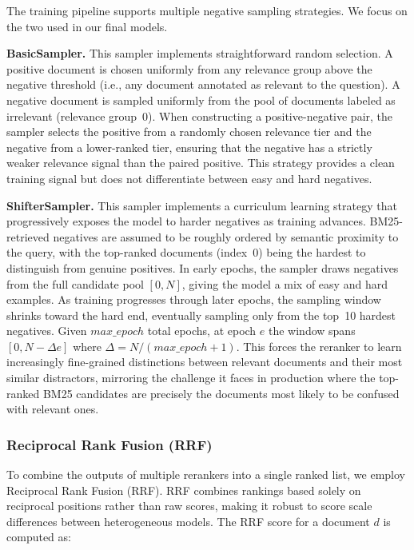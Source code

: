 The training pipeline supports multiple negative sampling strategies. We focus on the two used in our final models.

\textbf{BasicSampler.} This sampler implements straightforward random selection. A positive document is chosen uniformly from any relevance group above the negative threshold (i.e., any document annotated as relevant to the question). A negative document is sampled uniformly from the pool of documents labeled as irrelevant (relevance group~0). When constructing a positive-negative pair, the sampler selects the positive from a randomly chosen relevance tier and the negative from a lower-ranked tier, ensuring that the negative has a strictly weaker relevance signal than the paired positive. This strategy provides a clean training signal but does not differentiate between easy and hard negatives.

\textbf{ShifterSampler.} This sampler implements a curriculum learning strategy that progressively exposes the model to harder negatives as training advances. BM25-retrieved negatives are assumed to be roughly ordered by semantic proximity to the query, with the top-ranked documents (index~0) being the hardest to distinguish from genuine positives. In early epochs, the sampler draws negatives from the full candidate pool $[0, N]$, giving the model a mix of easy and hard examples. As training progresses through later epochs, the sampling window shrinks toward the hard end, eventually sampling only from the top~10 hardest negatives. Given $max\_epoch$ total epochs, at epoch $e$ the window spans $[0, N - \Delta e]$ where $\Delta = N / (max\_epoch + 1)$. This forces the reranker to learn increasingly fine-grained distinctions between relevant documents and their most similar distractors, mirroring the challenge it faces in production where the top-ranked BM25 candidates are precisely the documents most likely to be confused with relevant ones.

\subsubsection{Reciprocal Rank Fusion (RRF)}
\label{sec:fusion}

To combine the outputs of multiple rerankers into a single ranked list, we employ Reciprocal Rank Fusion (RRF). RRF combines rankings based solely on reciprocal positions rather than raw scores, making it robust to score scale differences between heterogeneous models. The RRF score for a document $d$ is computed as:

